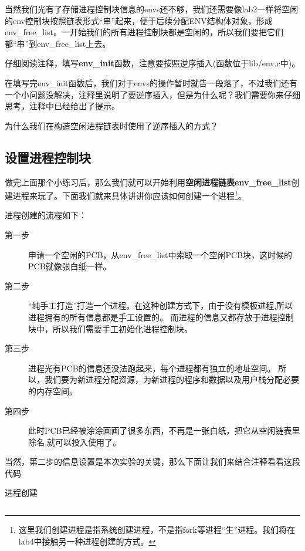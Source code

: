 当然我们光有了存储进程控制块信息的envs还不够，我们还需要像lab2一样将空闲的env控制块按照链表形式“串”起来，便于后续分配ENV结构体对象，形成env\_free\_list。一开始我们的所有进程控制块都是空闲的，所以我们要把它们都“串”到env\_free\_list上去。

\begin{exercise}
仔细阅读注释，填写\textbf{env\_init}函数，注意要按照逆序插入(函数位于lib/env.c中)。
\end{exercise}

在填写完env\_init函数后，我们对于envs的操作暂时就告一段落了，不过我们还有一个小问题没解决，注释里说明了要逆序插入，但是为什么呢？我们需要你来仔细思考，注释中已经给出了提示。

\begin{thinking}\label{think-env_init}
为什么我们在构造空闲进程链表时使用了逆序插入的方式？
\end{thinking}

\subsection{设置进程控制块}

做完上面那个小练习后，那么我们就可以开始利用\textbf{空闲进程链表env\_free\_list}创建进程来玩了。下面我们就来具体讲讲你应该如何创建一个进程\footnote{这里我们创建进程是指系统创建进程，不是指fork等进程“生”进程。我们将在lab4中接触另一种进程创建的方式。}。

进程创建的流程如下：

\begin{description}
  \item[第一步] 申请一个空闲的PCB，从env\_free\_list中索取一个空闲PCB块，这时候的PCB就像张白纸一样。
  \item[第二步] “纯手工打造”打造一个进程。在这种创建方式下，由于没有模板进程,所以进程拥有的所有信息都是手工设置的。
  而进程的信息又都存放于进程控制块中，所以我们需要手工初始化进程控制块。
  \item[第三步] 进程光有PCB的信息还没法跑起来，每个进程都有独立的地址空间。\label{process-3}
  所以，我们要为新进程分配资源，为新进程的程序和数据以及用户栈分配必要的内存空间。
  \item[第四步] 此时PCB已经被涂涂画画了很多东西，不再是一张白纸，把它从空闲链表里除名,就可以投入使用了。
\end{description}

当然，第二步的信息设置是本次实验的关键，那么下面让我们来结合注释看看这段代码

\begin{codeBoxWithCaption}{进程创建\label{code:env_alloc.c}}
  \inputminted[linenos]{c}{codes/env_alloc.c}
\end{codeBoxWithCaption}

